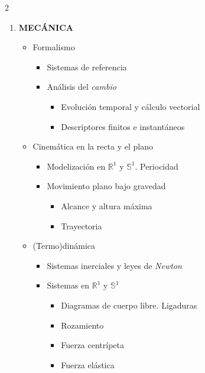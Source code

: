 \documentclass[a4paper,14pt]{extarticle}
\begin{document}
\begin{multicols}{2}
\begin{enumerate}
 \columnbreak	
 		\item {\bfseries \footnotesize MECÁNICA} 
 			\begin{itemize}[leftmargin=2mm]
 				\item Formalismo 
 					{\footnotesize
 					\begin{itemize}[leftmargin=6mm]
 						\item Sistemas de referencia 
 						\item Análisis del \textit{cambio}
 						{\footnotesize
 						\begin{itemize}[leftmargin=4mm]
 							\item Evolución temporal y cálculo vectorial
 							\item Descriptores finitos e instantáneos
 						\end{itemize}
 						}

 					\end{itemize}
 					}
 				\item Cinemática en la recta y el plano
 					{\footnotesize
 					\begin{itemize}[leftmargin=6mm]
 						\item Modelización en $\mathbb{R}^1$ y $\mathbb{S}^1$. Periocidad
 						\item Movimiento plano bajo gravedad 
 						{\footnotesize
 						\begin{itemize}[leftmargin=4mm]
 							\item Alcance y altura máxima
 							\item Trayectoria
 						\end{itemize}
 						}
 					\end{itemize}
 					}
 				\item (Termo)dinámica
 					{\footnotesize
 					\begin{itemize}[leftmargin=6mm]
 						\item Sistemas inerciales y leyes de \textit{Newton}
 						\item Sistemas en $\mathbb{R}^{1}$ y $\mathbb{S}^1$
 						{\footnotesize
 						\begin{itemize}[leftmargin=4mm]
 							\item Diagramas de cuerpo libre. Ligaduras
 							\item Rozamiento
 							\item Fuerza centrípeta
 							\item Fuerza elástica
 						\end{itemize}
 						}
 						

\end{itemize}}
\end{itemize}
\end{enumerate}
\end{multicols}
\end{document}
